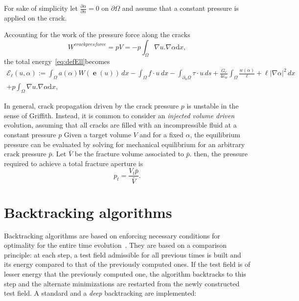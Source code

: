 \documentclass[10pt,oneside]{report}
\DeclareMathOperator{\e}{{\mathbf e}}
\begin{document}
For sake of simplicity let $\frac{\partial \alpha}{\partial n} = 0 $ on $\partial \Omega$ and assume that a constant pressure is applied on the crack.

Accounting for the work of the pressure force along the cracks
$$ W^{crack pres force} =  pV = - p \int_{\Omega} \nabla u . \nabla \alpha \mathrm{d}x,$$ 
the total energy~\eqref{eq:defEll}becomes
\begin{multline}
	\label{eq:defEllPressure}
	\mathcal{E}_\ell(u,\alpha) := \int_\Omega a(\alpha) W(\e(u))\, dx - \int_\Omega f\cdot u \, dx - \int_{\partial_n \Omega} \tau \cdot u \, ds + \frac{G_c}{4c_w} \int_\Omega \frac{w(\alpha)}{\ell} + \ell|\nabla \alpha|^2\, dx \\
    + p \int_{\Omega} \nabla u . \nabla \alpha \mathrm{d}x,
\end{multline}

In general, crack propagation driven by the crack pressure $p$ is unstable in the sense of Griffith.
Instead, it is common to consider an \emph{injected volume driven} evolution, assuming that all cracks are filled with an incompressible fluid at a constant pressure $p$
Given a target volume $V$ and for a fixed $\alpha$, the equilibrium pressure can be evaluated by solving for mechanical equilibrium for an arbitrary crack pressure $\bar{p}$.
Let $\bar{V}$ be the fracture volume associated to $\bar{p}$.
then, the pressure required to achieve a total fracture aperture is
$$ p_t=\frac{V_t \bar{p}}{\bar{V}}.$$

%
%
%
%


\section{Backtracking algorithms}
\label{sec:BT}
Backtracking algorithms are based on enforcing necessary conditions for optimality for the entire time evolution~\cite{Bourdin-2007a}. They are based on a comparison principle: at each step, a test field admissible for all previous times is built and its energy compared to that of the previously computed ones. If the test field is of lesser energy that the previously computed one, the algorithm backtracks to this step and the alternate minimizations are restarted from the newly constructed test field. A standard and a \emph{deep} backtracking are implemented:
\end{document}
